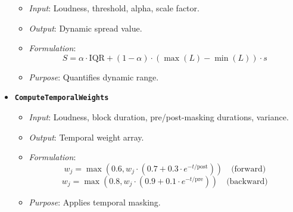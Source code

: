 \documentclass[11pt]{article}
\begin{document}
\begin{itemize}[label=$\bullet$]
\begin{itemize}
      \item \textit{Input}: Loudness, threshold, alpha, scale factor.
      \item \textit{Output}: Dynamic spread value.
      \item \textit{Formulation}:
        \begin{equation}
        S = \alpha \cdot \text{IQR} + (1 - \alpha) \cdot (\max(L) - \min(L)) \cdot s
        \end{equation}
      \item \textit{Purpose}: Quantifies dynamic range.
    \end{itemize}
  \item \textbf{\texttt{ComputeTemporalWeights}}
    \begin{itemize}
      \item \textit{Input}: Loudness, block duration, pre/post-masking durations, variance.
      \item \textit{Output}: Temporal weight array.
      \item \textit{Formulation}:
        \begin{equation}
        w_j = \max(0.6, w_j \cdot (0.7 + 0.3 \cdot e^{-t/\text{post}})) \quad \text{(forward)}
        \end{equation}
        \begin{equation}
        w_j = \max(0.8, w_j \cdot (0.9 + 0.1 \cdot e^{-t/\text{pre}})) \quad \text{(backward)}
        \end{equation}
      \item \textit{Purpose}: Applies temporal masking.
    \end{itemize}
\end{itemize}
\end{document}
